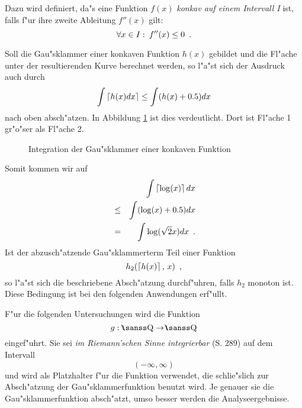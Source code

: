 Dazu wird definiert, da"s eine Funktion $f(x)$
 {\em konkav auf einem Intervall I} ist, falls f"ur ihre
zweite Ableitung $f''(x)$ gilt:
\[ \forall x \in I: \: f''(x) \leq 0 \mbox{\hspace{0.5em}.} \]

Soll die Gau"sklammer einer konkaven Funktion $h(x)$ gebildet und die
Fl"ache unter der resultierenden Kurve berechnet werden, so l"a"st sich
der Ausdruck auch durch
\[ \int \left\lceil h(x) dx \right\rceil \leq \int (h(x) + 0.5) dx \]
nach oben absch"atzen. In Abbildung \ref{PicKonkav} ist dies verdeutlicht.
Dort ist Fl"ache 1 gr"o"ser als Fl"ache 2.
\begin{figure}[htb]
\begin{center}
    
    \caption{Integration der Gau"sklammer einer konkaven Funktion}
    \label{PicKonkav}
\end{center}
\end{figure}
Somit kommen wir auf
\begin{eqnarray}
    & & \int \left\lceil \log(x) \right\rceil dx \nonumber \\
    & \leq & \int (\log(x) + 0.5 ) dx \label{EquLogNullFuenf} \\
    & = & \int \log(\sqrt{2}x) dx \nonumber \mbox{\hspace{0.5em}.}
\end{eqnarray}
Ist der abzusch"atzende Gau"sklammerterm Teil einer Funktion 
\[ h_2(\left\lceil h(x) \right\rceil,\, x ) \mbox{\hspace{0.5em},} \] so l"a"st sich die beschriebene
Absch"atzung durchf"uhren, falls $h_2$ monoton ist. Diese Bedingung ist bei 
den folgenden Anwendungen erf"ullt.

F"ur die folgenden Untersuchungen wird die Funktion
\[ g : \, \Rationals \rightarrow \Rationals \] eingef"uhrt. Sie sei
{ \em im Riemann'schen Sinne integrierbar } \cite{BS87} (S. 289)
auf dem Intervall \[ ( - \infty, \infty ) \] und
wird als Platzhalter f"ur die Funktion verwendet, die schlie"slich zur 
Absch"atzung der Gau"sklammerfunktion benutzt wird.
Je genauer sie die Gau"sklammerfunktion absch"atzt, umso besser werden
die Analyseergebnisse.

